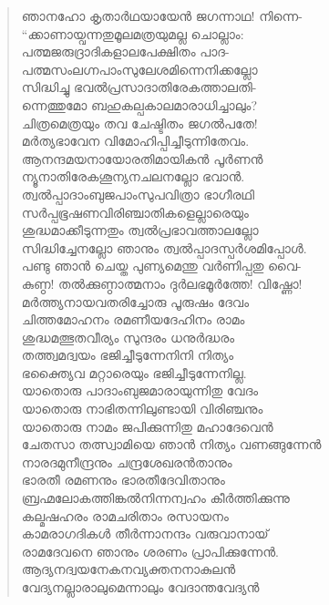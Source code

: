 \begin{verse}
ഞാനഹോ കൃതാര്‍ഥയായേന്‍ ജഗന്നാഥ! നിന്നെ-\\
“ക്കാണായ്വന്നതുമൂലമത്രയുമല്ല ചൊല്ലാം:\\
പത്മജരുദ്രാദികളാലപേക്ഷിതം പാദ-\\
പത്മസംലഗ്നപാംസുലേശമിന്നെനിക്കല്ലോ\\
സിദ്ധിച്ചു ഭവല്‍പ്രസാദാതിരേകത്താലതി-\\
ന്നെത്തുമോ ബഹുകല്പകാലമാരാധിച്ചാലും?\\
ചിത്രമെത്രയും തവ ചേഷ്ടിതം ജഗല്‍പതേ!\\
മര്‍ത്യഭാവേന വിമോഹിപ്പിച്ചീടുന്നിതേവം.\\
ആനന്ദമയനായോരതിമായികന്‍ പൂര്‍ണന്‍\\
ന്യൂനാതിരേകശൂന്യനചലനല്ലോ ഭവാന്‍.\\
ത്വല്‍പ്പാദാംബുജപാംസുപവിത്രാ ഭാഗീരഥി\\
സര്‍പ്പഭൂഷണവിരിഞ്ചാതികളെല്ലാരെയും\\
ശുദ്ധമാക്കീടുന്നതും ത്വല്‍പ്രഭാവത്താലല്ലോ\\
സിദ്ധിച്ചേനല്ലോ ഞാനും ത്വല്‍പ്പാദസ്പര്‍ശമിപ്പോള്‍.\\
പണ്ടു ഞാന്‍ ചെയ്ത പുണ്യമെന്തു വര്‍ണിപ്പതു വൈ-\\
കുണ്ഠ! തല്‍ക്കുണ്ഠാത്മനാം ദുര്‍ലഭമൂര്‍ത്തേ! വിഷ്ണോ!\\
മര്‍ത്ത്യനായവതരിച്ചോരു പൂരുഷം ദേവം\\
ചിത്തമോഹനം രമണീയദേഹിനം രാമം\\
ശുദ്ധമത്ഭുതവീര്യം സുന്ദരം ധനുര്‍ദ്ധരം\\
തത്ത്വമദ്വയം ഭജിച്ചീടുന്നേനിനി നിത്യം\\
ഭക്ത്യൈവ മറ്റാരെയും ഭജിച്ചീടുന്നേനില്ല.\\
യാതൊരു പാദാംബുജമാരായുന്നിതു വേദം\\
യാതൊരു നാഭിതന്നിലുണ്ടായി വിരിഞ്ചനും\\
യാതൊരു നാമം ജപിക്കുന്നിതു മഹാദേവെന്‍\\
ചേതസാ തത്സ്വാമിയെ ഞാന്‍ നിത്യം വണങ്ങുന്നേന്‍\\
നാരദമുനീന്ദ്രനും ചന്ദ്രശേഖരന്‍താനും\\
ഭാരതീ രമണനും ഭാരതീദേവിതാനും\\
ബ്രഹ്മലോകത്തിങ്കല്‍നിന്നന്വഹം കീര്‍ത്തിക്കുന്നു\\
കല്മഷഹരം രാമചരിതാം രസായനം\\
കാമരാഗദികള്‍ തീര്‍ന്നാനന്ദം വരുവാനായ്\\
രാമദേവനെ ഞാനും ശരണം പ്രാപിക്കുന്നേന്‍.\\
ആദ്യനദ്വയനേകനവ്യക്തനനാകുലന്‍\\
വേദ്യനല്ലാരാലുമെന്നാലും വേദാന്തവേദ്യന്‍\\

\end{verse}
